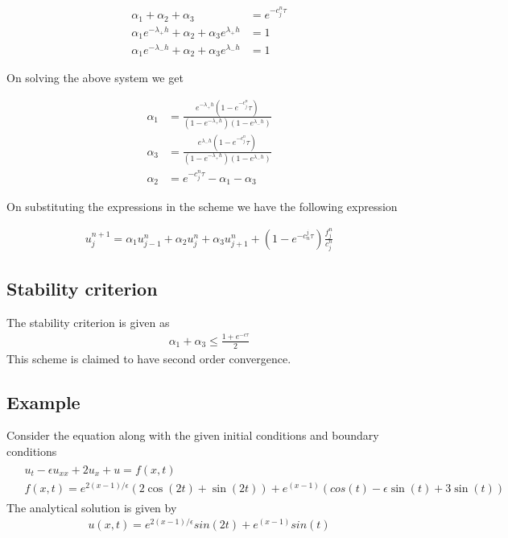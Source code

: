 \begin{align}
 \alpha_{1}+\alpha_{2}+\alpha_{3} &= e^{-c_{j}^{n}\tau}\\
 \alpha_{1}e^{-\lambda_{+}h}+\alpha_{2}+\alpha_{3}e^{\lambda_{+}h} &= 1\\
 \alpha_{1}e^{-\lambda_{-}h}+\alpha_{2}+\alpha_{3}e^{\lambda_{-}h} &= 1
\end{align}

On solving the above system we get

\begin{align}
\alpha_{1} &= \frac{e^{-\lambda_{+}h}(1-e^{-c_{j}^{n}}\tau)}{(1-e^{-\lambda_{+}h})(1-e^{\lambda_{-}h})}\\
\alpha_{3} &= \frac{e^{\lambda_{-}h}(1-e^{-c_{j}^{n}}\tau)}{(1-e^{-\lambda_{+}h})(1-e^{\lambda_{-}h})}\\
\alpha_{2} &= e^{-c_{j}^{n} \tau}-\alpha_{1}-\alpha_{3}
\end{align}

On substituting the expressions in the scheme we have the following expression

\begin{align*}
 u_{j}^{n+1} = \alpha_{1}u_{j-1}^{n}+\alpha_{2}u_{j}^{n}+\alpha_{3}u_{j+1}^{n} + (1-e^{-c_{n}^{j}\tau})\frac{f_{j}^{n}}{c_{j}^{n}}
\end{align*}

\subsection{Stability criterion}
The stability criterion is given as
\begin{align*}
 \alpha_{1} + \alpha_{3} \leq \frac{1+e^{-c \tau}}{2}
\end{align*}
This scheme is claimed to have second order convergence.
\subsection{Example}
Consider the equation along with the given initial conditions and boundary conditions
\begin{align}
 \begin{split}
  &u_{t}-\epsilon u_{xx} + 2u_{x} + u = f(x,t)\\
  &f(x,t) = e^{2(x-1)/\epsilon}(2\cos(2t)+\sin(2t))+e^{(x-1)}(cos(t)-\epsilon \sin(t)+3\sin(t))
 \end{split} 
\end{align}
The analytical solution is given by
\begin{align}
 u(x,t) = e^{2(x-1)/\epsilon}sin(2t) + e^{(x-1)}sin(t)
\end{align}

